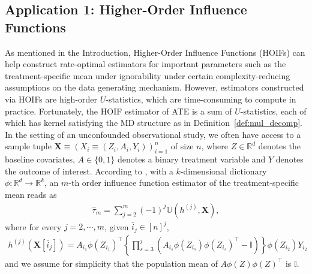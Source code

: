 \documentclass[twoside,11pt]{article}
\newcommand{\ustat}{\mathbb{U}}
\def\bbR{\mathbb{R}}
\begin{document}

\subsection{Application 1: Higher-Order Influence Functions}  
\label{sec:example_hoif}

As mentioned in the Introduction, Higher-Order Influence Functions (HOIFs) \citep{robins2008higher} can help construct rate-optimal estimators for important parameters such as the treatment-specific mean under ignorability under certain complexity-reducing assumptions on the data generating mechanism. However, estimators constructed via HOIFs are high-order $U$-statistics, which are time-consuming to compute in practice. Fortunately, the HOIF estimator of ATE is a sum of $U$-statistics, each of which has kernel satisfying the MD structure as in Definition~\ref{def:mul_decomp}. 
In the setting of an unconfounded observational study, we often have access to a sample tuple $\bm{X} \equiv (X_{i} \equiv (Z_{i}, A_{i}, Y_{i}))_{i = 1}^{n}$ of size $n$, where $Z \in \bbR^{d}$ denotes the baseline covariates, $A \in \{0, 1\}$ denotes a binary treatment variable and $Y$ denotes the outcome of interest. According to \citet{robins2008higher}, with a $k$-dimensional dictionary $\phi: \bbR^{d} \rightarrow \bbR^{k}$, an $m$-th order influence function estimator of the treatment-specific mean reads as
\begin{align*}
 \hat{\tau}_{m} = \sum_{j = 2}^{m} (-1)^{j} \ustat (h^{(j)}, \bm{X}), 
\end{align*}
where for every $j = 2, \cdots, m$, given $\bar{i}_{j} \in [n]^j$,
\begin{align*}
 h^{(j)} (\bm{X}[\bar{i}_{j}]) = A_{i_{1}} \phi (Z_{i_{1}})^{\top} \left\{ \prod_{s = 3}^{j} \left( A_{i_{s}} \phi (Z_{i_{s}}) \phi (Z_{i_{s}})^{\top} - \mathbb{I} \right) \right\} \phi (Z_{i_{2}}) Y_{i_{2}}
\end{align*}
and we assume for simplicity that the population mean of $A \phi (Z) \phi (Z)^{\top}$ is $\mathbb{I}$.
\end{document}
